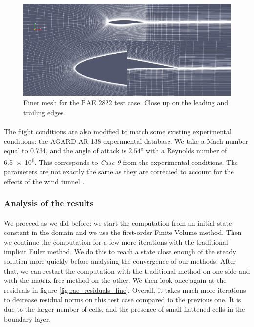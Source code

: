         \begin{figure}
          \centering
          \includegraphics[width=\textwidth]{figures/rae_mesh_fine.png}
          \caption{Finer mesh for the RAE 2822 test case. Close up on the leading and trailing edges.}
          \label{fig:rae_mesh_fine}
        \end{figure}

        \paragraph{}
        The flight conditions are also modified to match some existing experimental conditions: the AGARD-AR-138 experimental database.
        We take a Mach number equal to 0.734, and the angle of attack is $2.54\si{\degree}$ with a Reynolds number of \num{6.5e6}.
        This corresponds to \emph{Case 9} from the experimental conditions.
        The parameters are not exactly the same as they are corrected to account for the effects of the wind tunnel \cite{HellstromDavidsonRizzi1994}.


      \subsubsection{Analysis of the results}

        \paragraph{}
        We proceed as we did before: we start the computation from an initial state constant in the domain and we use the first-order Finite Volume method.
        Then we continue the computation for a few more iterations with the traditional implicit Euler method.
        We do this to reach a state close enough of the steady solution more quickly before analysing the convergence of our methods.
        After that, we can restart the computation with the traditional method on one side and with the matrix-free method on the other.
        We then look once again at the residuals in figure \ref{fig:rae_residuals_fine}.
        Overall, it takes much more iterations to decrease residual norms on this test case compared to the previous one.
        It is due to the larger number of cells, and the presence of small flattened cells in the boundary layer.


